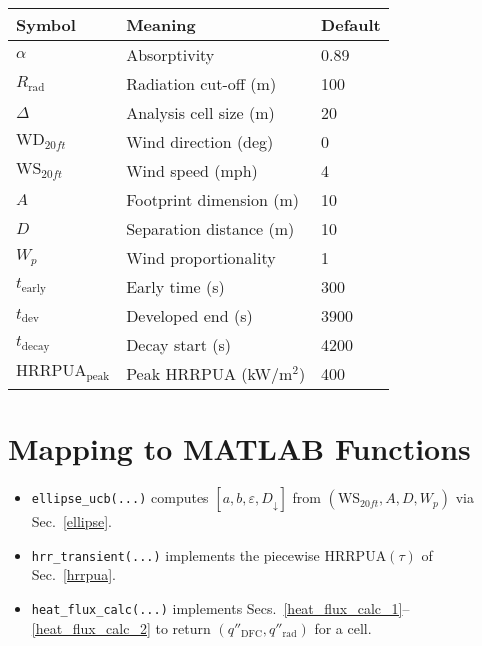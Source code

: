 \documentclass[a4paper,12pt]{article}
\begin{document}
\begin{center}
\begin{tabular}{lll}
\hline
Symbol & Meaning & Default \\
\hline
$\alpha$ & Absorptivity & 0.89 \\
$R_{\mathrm{rad}}$ & Radiation cut-off (m) & 100 \\
$\Delta$ & Analysis cell size (m) & 20 \\
$\mathrm{WD}_{20ft}$ & Wind direction (deg) & 0 \\
$\mathrm{WS}_{20ft}$ & Wind speed (mph) & 4 \\
$A$ & Footprint dimension (m) & 10 \\
$D$ & Separation distance (m) & 10 \\
$W_p$ & Wind proportionality & 1 \\
$t_{\mathrm{early}}$ & Early time (s) & 300 \\
$t_{\mathrm{dev}}$ & Developed end (s) & 3900 \\
$t_{\mathrm{decay}}$ & Decay start (s) & 4200 \\
$\mathrm{HRRPUA_{peak}}$ & Peak HRRPUA (kW/m$^2$) & 400 \\
\hline
\end{tabular}
\end{center}

\section{Mapping to MATLAB Functions}

\begin{itemize}[leftmargin=1.5em]
  \item \texttt{ellipse\_ucb(...)} computes $[a,b,\varepsilon,D_\downarrow]$ from $(\mathrm{WS}_{20ft},A,D,W_p)$ via Sec.~\ref{ellipse}.
  \item \texttt{hrr\_transient(...)} implements the piecewise $\mathrm{HRRPUA}(\tau)$ of Sec.~\ref{hrrpua}.
  \item \texttt{heat\_flux\_calc(...)} implements Secs.~\ref{heat_flux_calc_1}--\ref{heat_flux_calc_2} to return $(q''_{\mathrm{DFC}}, q''_{\mathrm{rad}})$ for a cell.
\end{itemize}

\printbibliography
\end{document}
